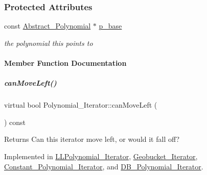 \subsubsection*{Protected Attributes}
\begin{DoxyCompactItemize}
\item 
\mbox{\label{group___iterator_group_aeb3da0d0f8b60eb68b1ffacb1b511417}} 
const \hyperlink{group__polygroup_class_abstract___polynomial}{Abstract\+\_\+\+Polynomial} $\ast$ \hyperlink{group___iterator_group_aeb3da0d0f8b60eb68b1ffacb1b511417}{p\+\_\+base}
\begin{DoxyCompactList}\small\item\em the polynomial {\ttfamily this} points to \end{DoxyCompactList}\end{DoxyCompactItemize}


\paragraph{Member Function Documentation}
\mbox{\label{group___iterator_group_a7ab348897446bc182500f84df8a9e590}} 
\subparagraph{\texorpdfstring{can\+Move\+Left()}{canMoveLeft()}}
{\footnotesize\ttfamily virtual bool Polynomial\+\_\+\+Iterator\+::can\+Move\+Left (\begin{DoxyParamCaption}{ }\end{DoxyParamCaption}) const\hspace{0.3cm}{\ttfamily [pure virtual]}}

\begin{DoxyReturn}{Returns}
Can this iterator move left, or would it fall off? 
\end{DoxyReturn}


Implemented in \hyperlink{group___iterator_group_a2df38ef3fd64b5e90432c754ce21f0c4}{L\+L\+Polynomial\+\_\+\+Iterator}, \hyperlink{group___iterator_group_a6c3db5961d5faf1b465c51e8935e0b89}{Geobucket\+\_\+\+Iterator}, \hyperlink{group___iterator_group_ade22e36aead8eca568dbd99c6ab73cc2}{Constant\+\_\+\+Polynomial\+\_\+\+Iterator}, and \hyperlink{group___iterator_group_a4094a88fd6d77894ff04960efd492ec6}{D\+B\+\_\+\+Polynomial\+\_\+\+Iterator}.

